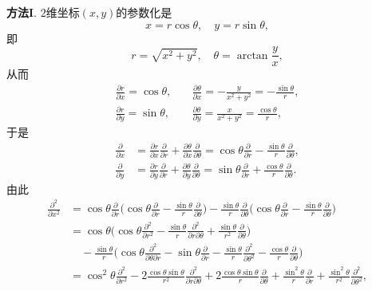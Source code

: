 \begin{itemize}
    \textbf{方法I}.
    $2$维坐标$(x,y)$的参数化是
    $$x=r\cos\theta,\quad y=r\sin\theta,$$
    即$$r=\sqrt{x^2+y^2},\quad\theta=\arctan\frac{y}{x},$$
    从而\begin{align*}\frac{\partial r}{\partial x}=\cos\theta,&\quad
    \frac{\partial\theta}{\partial x}=-\frac{y}{x^2+y^2}=-\frac{\sin\theta}{r},\\
    \frac{\partial r}{\partial y}=\sin\theta,&\quad
    \frac{\partial\theta}{\partial y}=\frac{x}{x^2+y^2}=\frac{\cos\theta}{r},
    \end{align*}
    于是
    \begin{align*}\frac{\partial}{\partial x}
    &=\frac{\partial r}{\partial x}\frac{\partial}{\partial r}
    +\frac{\partial\theta}{\partial x}\frac{\partial}{\partial\theta}
    =\cos\theta\frac{\partial}{\partial r}
    -\frac{\sin\theta}{r}\frac{\partial}{\partial\theta},\\
    \frac{\partial}{\partial y}
    &=\frac{\partial r}{\partial y}\frac{\partial}{\partial r}
    +\frac{\partial\theta}{\partial y}\frac{\partial}{\partial\theta}
    =\sin\theta\frac{\partial}{\partial r}
    +\frac{\cos\theta}{r}\frac{\partial}{\partial\theta}.
    \end{align*}
    由此
    \begin{align*}\frac{\partial^2}{\partial x^2}
    &=\cos\theta\frac{\partial}{\partial r}\bigg(\!\cos\theta\frac{\partial}{\partial r}
    -\frac{\sin\theta}{r}\frac{\partial}{\partial\theta}\bigg)
    -\frac{\sin\theta}{r}\frac{\partial}{\partial\theta}\bigg(\!\cos\theta\frac{\partial}{\partial r}
    -\frac{\sin\theta}{r}\frac{\partial}{\partial\theta}\bigg)\\
    &=\cos\theta\bigg(\!\cos\theta\frac{\partial^2}{\partial r^2}
    -\frac{\sin\theta}{r}\frac{\partial^2}{\partial r\partial\theta}
    +\frac{\sin\theta}{r^2}\frac{\partial}{\partial\theta}\bigg)\\
    &\quad-\frac{\sin\theta}{r}\bigg(\!\cos\theta\frac{\partial^2}{\partial\theta\partial r}-\sin\theta\frac{\partial}{\partial r}
    -\frac{\sin\theta}{r}\frac{\partial^2}{\partial\theta^2}-\frac{\cos\theta}{r}\frac{\partial}{\partial\theta}\bigg)\\
    &=\cos^2\theta\frac{\partial^2}{\partial r^2}-2\frac{\cos\theta\sin\theta}{r^2}\frac{\partial^2}{\partial r\partial\theta}
    +2\frac{\cos\theta\sin\theta}{r}\frac{\partial}{\partial\theta}
    +\frac{\sin^2\theta}{r}\frac{\partial}{\partial r}
    +\frac{\sin^2\theta}{r^2}\frac{\partial^2}{\partial\theta^2},\\

\end{align*}
\end{itemize}
